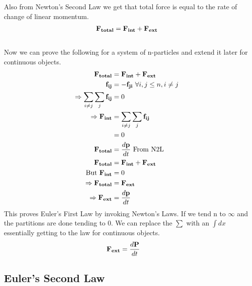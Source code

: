 \documentclass{article}
\begin{document}
Also from Newton's Second Law we get that total force is equal to the rate of change of linear momentum.
\begin{align*}
    \vb{F_{total}} &= \vb{F_{int}} + \vb{F_{ext}}\\
\end{align*}
\\
Now we can prove the following for a system of n-particles and extend it later for continuous objects.
\begin{align*}
    \vb{F_{total}} &= \vb{F_{int}} + \vb{F_{ext}}\\
    \vb{f_{ij}} &= -\vb{f_{ji}}\text{     }\forall i,j\leq n,i\neq j \\
    \Rightarrow \sum_{i\neq j} \sum_j \vb{f_{ij}} &=0\\
    \Rightarrow \vb{F_{int}} &=\sum_{i\neq j} \sum_j \vb{f_{ij}}\\
    & = 0\\
    \vb{F_{total}} &= \frac{d\vb{p}}{dt} \text{          From N2L}\\
    \vb{F_{total}} &= \vb{F_{int}} + \vb{F_{ext}}\\
    \text{But    } \vb{F_{int}} &= 0\\
    \Rightarrow \vb{F_{total}} &= \vb{F_{ext}}\\
    \Rightarrow \vb{F_{ext}} &= \frac{d\vb{p}}{dt}
\end{align*}
This proves Euler's First Law by invoking Newton's Laws. If we tend n to $\infty$ and the partitions are done tending to 0. We can replace the $\sum$ with an $\int dx$ essentially getting to the law for continuous objects.\\
\begin{align*}
    \vb{F_{ext}} &= \frac{d\vb{P}}{dt}
\end{align*}
\subsection{Euler's Second Law}
\end{document}

